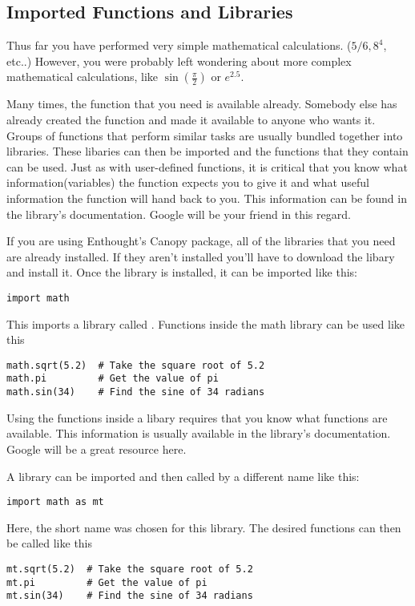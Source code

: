 \subsection*{Imported Functions and Libraries}
Thus far you have performed very simple mathematical
calculations. ($5/6, 8^4$, etc..)
However, you were probably left wondering about more complex
mathematical calculations, like $\sin(\frac{\pi}{2})$ or $e^{2.5}$.

Many times, the function that you need is available already. Somebody
else has already created the function and made it available to anyone
who wants it.  Groups of functions that perform similar tasks are usually
bundled together into libraries. These libaries can then be imported
and the functions that they contain can be used.  Just as with
user-defined functions, it is critical that you know what
information(variables) the function expects you to give it and what
useful information the function will hand back to you.  This
information can be found in the library's documentation.  Google will
be your friend in this regard.


If you are using Enthought's Canopy package, all of the
  libraries that you need are already installed.  If they aren't
  installed you'll have to download the libary and install it. Once
  the library is installed, it can be imported like this:
\begin{Verbatim}
import math
\end{Verbatim}
This imports a library called .  Functions inside the
math library can be used like this
\begin{Verbatim}
math.sqrt(5.2)  # Take the square root of 5.2
math.pi         # Get the value of pi
math.sin(34)    # Find the sine of 34 radians
\end{Verbatim}
Using the functions inside a libary requires that you know what
functions are available.  This information is usually available in the
library's documentation.  Google will be a great resource here.

A library can be imported and then called by a different name like
this:
\begin{Verbatim}
import math as mt
\end{Verbatim}
Here, the short name  was chosen for this library.
The desired functions can then be called like this
\begin{Verbatim}
mt.sqrt(5.2)  # Take the square root of 5.2
mt.pi         # Get the value of pi
mt.sin(34)    # Find the sine of 34 radians
\end{Verbatim}

